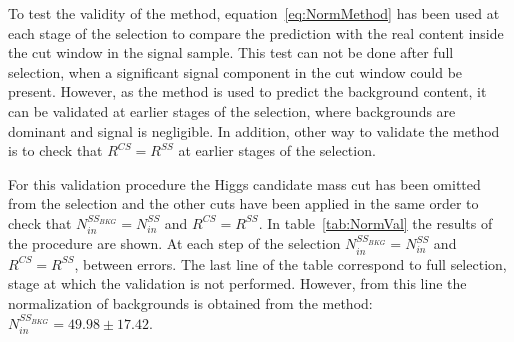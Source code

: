 To test the validity of the method, equation~\ref{eq:NormMethod} has been used at each stage of the selection to compare the prediction with the real content inside the cut window in the signal sample. This test can not be done after full selection, when a significant signal component in the cut window could be present. However, as the method is used to predict the background content, it can be validated at earlier stages of the selection, where backgrounds are dominant and signal is negligible. In addition, other way to validate the method is to check that $R^{CS}=R^{SS}$ at earlier stages of the selection.

For this validation procedure the Higgs candidate mass cut has been omitted from the selection and the other cuts have been applied in the same order to check that $N^{SS_{BKG}}_{in}=N^{SS}_{in}$ and $R^{CS}=R^{SS}$. In table~\ref{tab:NormVal} the results of the procedure are shown. At each step of the selection $N^{SS_{BKG}}_{in}=N^{SS}_{in}$ and $R^{CS}=R^{SS}$, between errors. The last line of the table correspond to full selection, stage at which the validation is not performed. However, from this line the normalization of backgrounds is obtained from the method: $N^{SS_{BKG}}_{in}=49.98\pm17.42$.

\begin{table*}[htbH]
\begin{center}
\caption{Results of validation procedure of estimation of normalization. We start the validation after $\chi^{2}$ cut. All other cuts are applied progressively. The last line correspond to full selection, reason why $R^{SS}$ and $N^{SS}_{in}$ are blinded for the validation procedure. \label{tab:NormVal}}
\end{center}
\end{table*}

